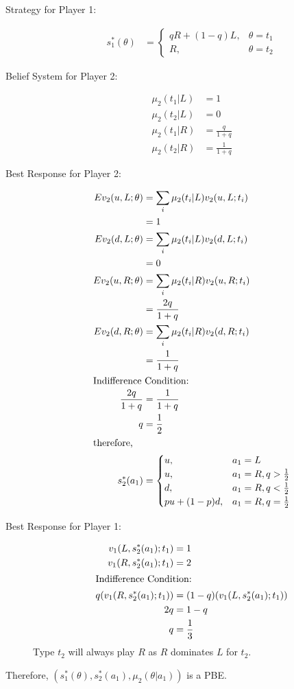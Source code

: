 \documentclass[10pt]{extarticle}
\begin{document}
    \begin{description}
      \item[Strategy for Player 1:]
        \begin{align*}
          s_1^{\ast}(\theta) &= \begin{cases}
            qR + (1-q)L,& \theta = t_1\\
            R,&\theta = t_2
          \end{cases}
        \end{align*}
      \item[Belief System for Player 2:]
        \begin{align*}
          \mu_2(t_1|L) &= 1\\
          \mu_2(t_2|L) &= 0\\
          \mu_2(t_1|R) &= \frac{q}{1+q}\\
          \mu_2(t_2|R) &= \frac{1}{1+q}
        \end{align*}
      \item[Best Response for Player 2:]
        \begin{align*}
          Ev_2(u,L;\theta) &= \sum_{i}\mu_2(t_i|L)v_2(u,L;t_i)\\
                           &= 1\\
          Ev_2(d,L;\theta) &= \sum_{i}\mu_2(t_i|L)v_2(d,L;t_i)\\
                           &= 0\\
          Ev_2(u,R;\theta) &= \sum_{i}\mu_2(t_i|R)v_2(u,R;t_i) \\
                           &= \frac{2q}{1+q}\\
          Ev_2(d,R;\theta) &= \sum_{i}\mu_2(t_i|R)v_2(d,R;t_i)\\
                           &= \frac{1}{1+q}\\
          \shortintertext{Indifference Condition:}
          \frac{2q}{1+q} &= \frac{1}{1+q}\\
          q &= \frac{1}{2}\\
          \shortintertext{therefore,}
          s_2^{\ast}(a_1) &= \begin{cases}
            u,&a_1 = L\\
            u,&a_1=R,q > \frac{1}{2}\\
            d,&a_1 = R,q < \frac{1}{2}\\
            pu + (1-p)d,&a_1 = R,q = \frac{1}{2}
          \end{cases}
        \end{align*}
      \item[Best Response for Player 1:]
        \begin{align*}
          v_1(L,s_2^{\ast}(a_1);t_1) &= 1\\
          v_1(R,s_2^{\ast}(a_1);t_1) &= 2\\
          \shortintertext{Indifference Condition:}
          q(v_1(R,s_2^{\ast}(a_1);t_1)) &= (1-q)(v_1(L,s_2^{\ast}(a_1);t_1))\\
          2q &= 1-q\\
          q &= \frac{1}{3}
        \end{align*}
        Type $t_2$ will always play $R$ as $R$ dominates $L$ for $t_2$.
    \end{description}
    Therefore, $(s_1^{\ast}(\theta),s_2^{\ast}(a_1),\mu_2(\theta|a_1))$ is a PBE.
  
\end{document}
